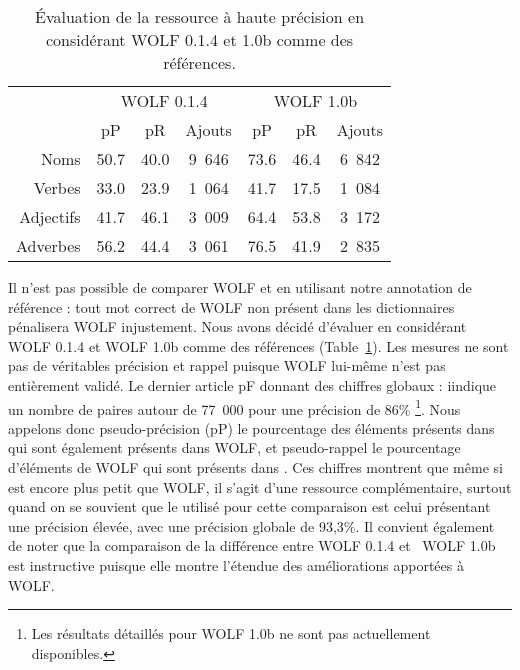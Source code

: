 \begin{table}[ht]
\centering
\begin{tabular}{rccc|ccc}
  \toprule
             & \multicolumn{3}{c}{WOLF 0.1.4}    & \multicolumn{3}{c}{WOLF 1.0b} \\
             &   pP      &    pR     & Ajouts    &     pP    &    pR    & Ajouts \\
  Noms       & 50.7     & 40.0     & 9~646     & 73.6     & 46.4    & 6~842  \\
  Verbes     & 33.0     & 23.9     & 1~064     & 41.7     & 17.5    & 1~084  \\
  Adjectifs  & 41.7     & 46.1     & 3~009     & 64.4     & 53.8    & 3~172  \\
  Adverbes   & 56.2     & 44.4     & 3~061     & 76.5     & 41.9    & 2~835  \\ 
  \bottomrule
\end{tabular}
\caption{\protect\centering\label{table:wolfcomparison}Évaluation de la ressource à haute précision en considérant WOLF 0.1.4 et 1.0b comme des références.}
\end{table}


Il n'est pas possible de comparer WOLF et \newjaws{} en utilisant notre annotation de référence : tout mot correct de WOLF non présent dans les dictionnaires pénalisera WOLF injustement. Nous avons décidé d'évaluer \newjaws{} en considérant WOLF 0.1.4 et WOLF 1.0b comme des références (Table~\ref{table:wolfcomparison}). Les mesures ne sont pas de véritables précision et rappel puisque WOLF lui-même n'est pas entièrement validé. Le dernier article pF donnant des chiffres globaux \citep{sagot2012automatic} : iindique un nombre de paires autour de 77~000 pour une précision de 86\% \footnote{Les résultats détaillés pour WOLF 1.0b ne sont pas actuellement disponibles.}. Nous appelons donc pseudo-précision (pP) le pourcentage des éléments présents dans \newjaws{} qui sont également présents dans WOLF, et pseudo-rappel le pourcentage d'éléments de WOLF qui sont présents dans \newjaws{}. Ces chiffres montrent que même si \newjaws{} est encore plus petit que WOLF, il s'agit d'une ressource complémentaire, surtout quand on se souvient que le \newjaws{} utilisé pour cette comparaison est celui présentant une précision élevée, avec une précision globale de 93,3\%. Il convient également de noter que la comparaison de la différence entre WOLF 0.1.4 et \ WOLF 1.0b est instructive puisque elle montre l'étendue des améliorations apportées à WOLF.

